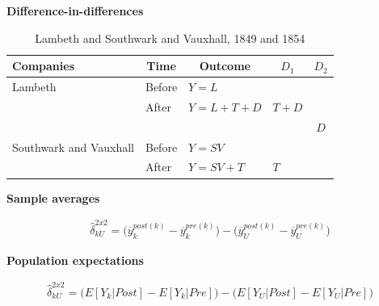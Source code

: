\documentclass[notes=show]{beamer}
\begin{document}
\begin{frame}[plain]
\begin{center}
\textbf{Difference-in-differences}
\end{center}

\begin{table}\centering
		\caption{Lambeth and Southwark and Vauxhall, 1849 and 1854}
		\begin{center}
		\begin{tabular}{lll|lc}
		\toprule
		\multicolumn{1}{l}{\textbf{Companies}}&
		\multicolumn{1}{c}{\textbf{Time}}&
		\multicolumn{1}{c}{\textbf{Outcome}}&
		\multicolumn{1}{c}{$D_1$}&
		\multicolumn{1}{c}{$D_2$}\\
		\midrule
		Lambeth & Before & $Y=L$ \\
		& After & $Y=L + T + D$ & $T+D$\\
		\midrule
		& & & & $D$ \\
		\midrule
		Southwark and Vauxhall & Before & $Y=SV$ \\
		& After & $Y=SV + T$ & $T$\\
		\bottomrule
		\end{tabular}
		\end{center}
	\end{table}

\end{frame}




\begin{frame}[plain]
\begin{center}
\textbf{Sample averages}
\end{center}

\begin{eqnarray*}
\widehat{\delta}^{2x2}_{kU} = \bigg ( \overline{y}_k^{post(k)} - \overline{y}_k^{pre(k)} \bigg ) - \bigg ( \overline{y}_U^{post(k)} - \overline{y}_U^{pre(k)} \bigg )
\end{eqnarray*}

\end{frame}

\begin{frame}[plain]
\begin{center}
\textbf{Population expectations}
\end{center}

\begin{eqnarray*}
\widehat{\delta}^{2x2}_{kU} = \bigg ( E[Y_k|Post] - E[Y_k|Pre] \bigg ) - \bigg ( E[Y_U | Post ] - E[ Y_U | Pre] \bigg) \\
\end{eqnarray*}

\end{frame}
\end{document}
